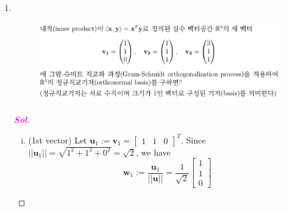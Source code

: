 \documentclass[10pt]{article}
\theoremstyle{definition}
\newcommand{\sol}{\textcolor{magenta}{\bf Sol}}
\newcommand{\inv}[1]{{#1}^{-1}}
\newcommand{\norms}[1]{|| #1||}
\renewcommand{\vec}[1]{\textbf{#1}}
\begin{document}
\begin{enumerate}[\bf 1.]
\begin{proof}[\sol]
\[\pi_W(\vec{v})=\textbf{B}\boldsymbol{\lambda}
=\begin{bmatrix}
	1&1\\1&-1\\0&0
\end{bmatrix}\begin{bmatrix}
0 \\ 1
\end{bmatrix}=\begin{bmatrix}
1\\-1\\0
\end{bmatrix}
\] and \[
P_\pi=\textbf{B}\inv{(\textbf{B}^T\textbf{B})}\textbf{B}^T
=\begin{bmatrix}
	1&1\\1&-1\\0&0
\end{bmatrix}\begin{bmatrix}
1/2&-1/2&0\\ 1/2&1/2&0	
\end{bmatrix}=\begin{bmatrix}
1&0&0\\0&-1&0\\0&0&0
\end{bmatrix}.
\]
\end{proof}
\newpage
\item \ \begin{figure}[h!]
	\includegraphics[scale=.35]{asgmt1_5.png}
\end{figure}
\begin{proof}[\sol]
	\begin{enumerate}[(i)]
		\item (1st vector) Let \(\textbf{u}_1:=\textbf{v}_1=\begin{bmatrix}
			1&1&0
		\end{bmatrix}^T.\) Since \(\norms{\vec{u}_1}=\sqrt{1^2+1^2+0^2}=\sqrt{2}\), we have \[
		\textbf{w}_1:=\frac{\vec{u}_1}{\norms{\vec{u}}}=\frac{1}{\sqrt{2}}\begin{bmatrix}
			1\\1\\0

\end{bmatrix}\]
\end{enumerate}
\end{proof}
\end{enumerate}
\end{document}
